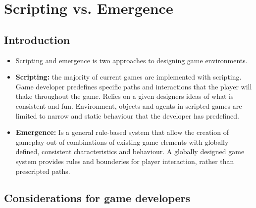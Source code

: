 \chapter*{Scripting vs. Emergence}

\section*{Introduction}

  \begin{itemize}
    \item Scripting and emergence is two approaches to designing game environments.
    \item {\bf Scripting:} the majority of current games are implemented with scripting. Game developer predefines specific paths and interactions that the player will thake throughout the game. Relies on a given designers ideas of what is consistent and fun. Environment, objects and agents in scripted games are limited to narrow and static behaviour that the developer has predefined. 
    \item {\bf Emergence:} Is a general rule-based system that allow the creation of gameplay out of combinations of existing game elements with globally defined, consistent characteristics and behaviour. A globally designed game system provides rules and bounderies for player interaction, rather than prescripted paths. 
  \end{itemize}

\section*{Considerations for game developers}

